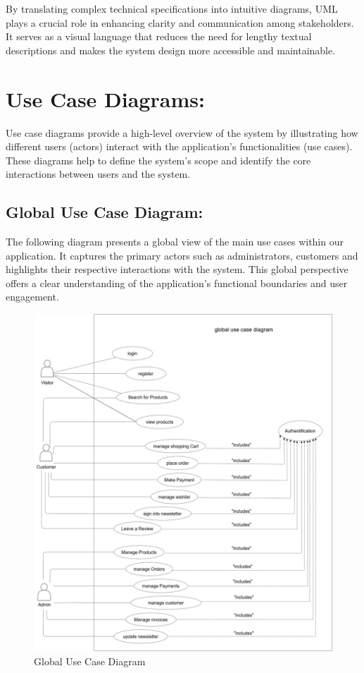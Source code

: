By translating complex technical specifications into intuitive diagrams, UML plays a crucial role in enhancing clarity and communication among stakeholders. It serves as a visual language that reduces the need for lengthy textual descriptions and makes the system design more accessible and maintainable.

\section{Use Case Diagrams:}

Use case diagrams provide a high-level overview of the system by illustrating how different users (actors) interact with the application's functionalities (use cases). These diagrams help to define the system's scope and identify the core interactions between users and the system.

\subsection{Global Use Case Diagram:}

The following diagram presents a global view of the main use cases within our application. It captures the primary actors such as administrators, customers and highlights their respective interactions with the system. This global perspective offers a clear understanding of the application's functional boundaries and user engagement.\\

\newpage
\begin{figure}[!h]
\begin{center}
\includegraphics{images/Global Use Case Diagram.png}
\end{center}
\caption{Global Use Case Diagram}
\end{figure}



